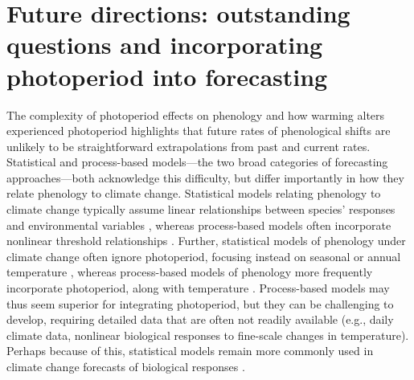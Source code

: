 \documentclass{article}
\begin{document}
\section*{Future directions: outstanding questions and incorporating photoperiod into forecasting}
\par The complexity of photoperiod effects on phenology and how warming alters experienced photoperiod highlights that future rates of phenological shifts are unlikely to be straightforward extrapolations from past and current rates. Statistical and process-based models---the two broad categories of forecasting approaches---both acknowledge this difficulty, but differ importantly in how they relate phenology to climate change. Statistical models relating phenology to climate change typically assume linear relationships between species' responses and environmental variables \citep[e.g., ][]{flynn2018,ibanez2010}, whereas process-based models often incorporate nonlinear threshold relationships \citep[e.g.][]{chuine2001,morin2009}. Further, statistical models of phenology under climate change often ignore photoperiod, focusing instead on seasonal or annual temperature \citep[e.g.][but see \citet{richardson2013}]{diez2012,ibanez2010}, whereas process-based models of phenology more frequently incorporate photoperiod, along with temperature \citep{lundell2020,duputie2015,zhao2013,morin2009}. Process-based models may thus seem superior for integrating photoperiod, but they can be challenging to develop, requiring detailed data that are often not readily available (e.g., daily climate data, nonlinear biological responses to fine-scale changes in temperature). Perhaps because of this, statistical models remain more commonly used in climate change forecasts of biological responses \citep[e.g.,][]{garcia2016,Basler:2012,diez2012,zhu2012,ibanez2010}.
\end{document}
